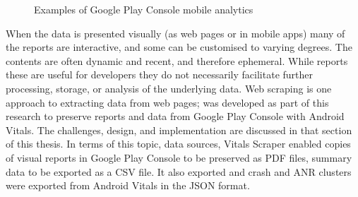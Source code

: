\begin{figure}
    \centering
    \qquad
    \caption{Examples of Google Play Console mobile analytics}
    \label{fig:examples-of-gpc-with-av-mobile-analytics-reports}
\end{figure}

When the data is presented visually (as web pages or in mobile apps) many of the reports are interactive, and some can be customised to varying degrees. The contents are often dynamic and recent, and therefore ephemeral. While reports these are useful for developers they do not necessarily facilitate further processing, storage, or analysis of the underlying data. Web scraping is one approach to extracting data from web pages; \href{section-vitals-scraper}{} was developed as part of this research to preserve reports and data from Google Play Console with Android Vitals. The challenges, design, and implementation are discussed in that section of this thesis. In terms of this topic, data sources, Vitals Scraper enabled copies of visual reports in Google Play Console to be preserved as PDF files, summary data to be exported as a CSV file. It also exported and crash and ANR clusters were exported from Android Vitals in the JSON format.

